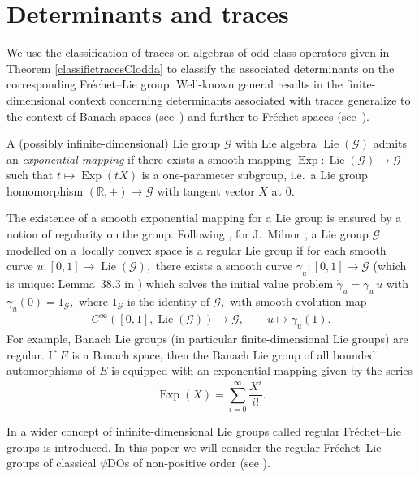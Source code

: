 \documentclass[pdftex]{sigma}
\DeclareMathOperator{\Lie}{Lie} \DeclareMathOperator{\Det}{Det}
\DeclareMathOperator{\Exp}{Exp} \DeclareMathOperator{\rk}{rk}
\begin{document}
\section{Determinants and traces}\label{section4}

We use the classif\/ication of traces on algebras of odd-class operators given in Theorem \ref{classifictracesClodda} to classify the associated determinants on the corresponding Fr\'echet--Lie group. Well-known ge\-ne\-ral results in the f\/inite-dimensional context concerning determinants associated with traces generalize to the context of Banach spaces (see~\cite{HarpeSkandalis}) and further to Fr\'echet spaces (see~\cite{lescure}).
\begin{definition} \label{defin:ExponintialMapping}
A (possibly inf\/inite-dimensional) Lie group ${\mathcal{G}}$ with Lie algebra $\Lie({\mathcal{G}})$ admits an \emph{exponential mapping} if there exists a smooth mapping ${\Exp}:\Lie({\mathcal{G}})\to{\mathcal{G}}$ such that $t\mapsto {\Exp}(tX)$ is a one-parameter subgroup, i.e.\ a Lie group homomorphism $(\mathbb{R},+)\to {\mathcal{G}}$ with tangent vector $X$ at $0$.
\end{definition}

The existence of a smooth exponential mapping for a Lie group is ensured by a notion of regularity \cite{KrieglMichor,Milnor} on the group. Following \cite{KrieglMichor}, for J.~Milnor \cite{Milnor}, a Lie group ${\mathcal{G}}$ modelled on a~locally convex space is a regular Lie group if for each smooth curve $u:[0, 1]\to \Lie({\mathcal{G}}),$ there exists a smooth curve $\gamma_u:[0, 1]\to {\mathcal{G}}$ (which is unique: Lemma~38.3 in \cite{KrieglMichor}) which solves the initial value problem $\dot\gamma_u=\gamma_u\,u$ with $\gamma_u(0)=1_{\mathcal{G}},$ where $1_{\mathcal{G}}$ is the identity of ${\mathcal{G}},$ with smooth evolution map
\begin{gather*}
 C^{\infty}([0, 1], \Lie({\mathcal{G}})) \to {\mathcal{G}}, \qquad
 u \mapsto \gamma_u(1).
\end{gather*}
For example, Banach Lie groups (in particular f\/inite-dimensional Lie groups) are regular. If $E$ is a Banach space, then the Banach Lie group of all bounded
automorphisms of $E$ is equipped with an exponential mapping given by the series
\[
\Exp(X)=\sum_{i=0}^\infty\dfrac{X^i}{i!}.
\]

In \cite{kmoyIV} a wider concept of inf\/inite-dimensional Lie groups called regular Fr\'echet--Lie groups is introduced. In this paper we will consider the regular Fr\'echet--Lie groups of classical $\psi$DOs of non-positive order (see \cite{kmoy}).
\end{document}
